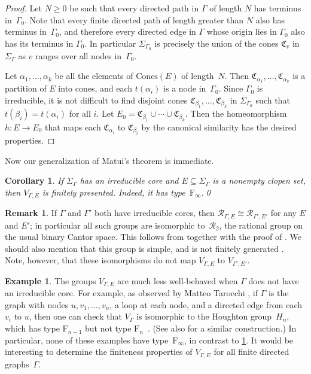 \documentclass[11pt,letterpaper]{amsart}
\newtheorem{corollary}[theorem]{Corollary}
\theoremstyle{definition}
\newtheorem{remark}[theorem]{Remark}
\newtheorem{example}[theorem]{Example}
\newcommand{\R}{\mathcal{R}}
\newcommand{\C}{\mathfrak{C}}
\newcommand{\F}{\mathrm{F}}
\newcommand{\Cones}{\mathrm{Cones}}
\begin{document}
\begin{proof}
Let $N\geq 0$ be such that every directed path in $\Gamma$ of length $N$ has terminus in~$\Gamma_0$.  Note that every finite directed path of length greater than $N$ also has terminus in~$\Gamma_0$, and therefore every directed edge in $\Gamma$ whose origin lies in $\Gamma_0$ also has its terminus in $\Gamma_0$.  In particular $\Sigma_{\Gamma_0}$ is precisely the union of the cones $\C_v$ in $\Sigma_\Gamma$ as $v$ ranges over all nodes in~$\Gamma_0$.

Let $\alpha_1,\ldots,\alpha_k$ be all the elements of $\Cones(E)$ of length~$N$. Then $\C_{\alpha_1},\ldots, \C_{\alpha_k}$ is a partition of $E$ into cones, and each $t(\alpha_i)$ is a node in~$\Gamma_0$.  Since $\Gamma_0$ is irreducible, it is not difficult to find disjoint cones $\C_{\beta_1},\ldots,\C_{\beta_k}$ in $\Sigma_{\Gamma_0}$ such that $t(\beta_i)=t(\alpha_i)$ for all $i$.  Let $E_0=\C_{\beta_1}\cup \cdots\cup \C_{\beta_k}$. Then the homeomorphism $h\colon E\to E_0$ that maps each $\C_{\alpha_i}$ to $\C_{\beta_i}$ by the canonical similarity has the desired properties.
\end{proof}

Now our generalization of Matui's theorem is immediate.

\begin{corollary}\label{cor:V_fp}
If\/ $\Sigma_\Gamma$ has an irreducible core and $E\subseteq \Sigma_\Gamma$ is a nonempty clopen set, then $V_{\Gamma,E}$ is finitely presented.  Indeed, it has type\/~$\F_{\!\infty}$.\qed
\end{corollary}


\begin{remark}
If $\Gamma$ and $\Gamma'$ both have irreducible cores, then $\R_{\Gamma,E}\cong \R_{\Gamma',E'}$ for any $E$ and $E'$; in particular all such groups are isomorphic to~$\R_2$, the rational group on the usual binary Cantor space. This follows from \cite[Proposition~2.22]{BelkBleakMatucci} together with the proof of \cite[Theorem~2.16]{BelkBleakMatucci}. We should also mention that this group is simple, and is not finitely generated \cite{Belk-Hyde-Matucci-1}.  Note, however, that these isomorphisms do not map $V_{\Gamma,E}$ to $V_{\Gamma',E'}$.
\end{remark}

\begin{example}\label{ex:houghton}
The groups $V_{\Gamma,E}$ are much less well-behaved when $\Gamma$ does not have an irreducible core. For example, as observed by Matteo Tarocchi \cite{Tarocchi}, if $\Gamma$ is the graph with nodes $u,v_1,\ldots,v_n$, a loop at each node, and a directed edge from each $v_i$ to $u$, then one can check that $V_{\Gamma}$ is isomorphic to the Houghton group~$H_n$, which has type $\F_{\!n-1}$ but not type $\F_{\!n}$~\cite{Brown}. (See also \cite[Proposition~3.7.4]{cornulier14} for a similar construction.) In particular, none of these examples have type~$\F_{\!\infty}$, in contrast to \cref{cor:V_fp}.  It would be interesting to determine the finiteness properties of $V_{\Gamma,E}$ for all finite directed graphs~$\Gamma$.
\end{example}
\end{document}
